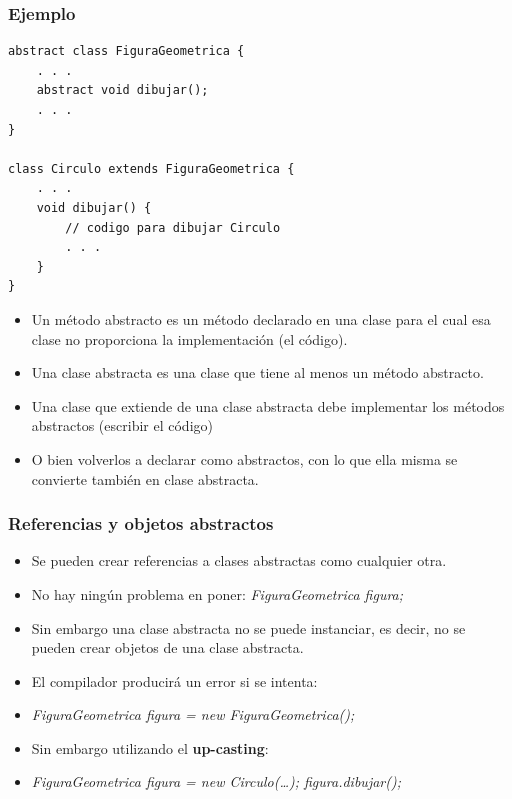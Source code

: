 \documentclass{beamer}
\begin{document}
\begin{frame}[fragile]
\frametitle{Ejemplo}
\begin{scriptsize}
\begin{verbatim}
abstract class FiguraGeometrica {
    . . .
    abstract void dibujar();
    . . .
}

class Circulo extends FiguraGeometrica {
    . . .
    void dibujar() {
        // codigo para dibujar Circulo
        . . .
    }
} 
\end{verbatim}
\pause
\begin{itemize}[<+->]
\item  Un método abstracto es un método declarado en una clase para el cual esa clase no proporciona la implementación (el código).
\item Una clase abstracta es una clase que tiene al menos un método abstracto.
\item Una clase que extiende de una clase abstracta debe implementar los métodos abstractos (escribir el código)
\item O bien volverlos a declarar como abstractos, con lo que ella misma se convierte también en clase abstracta. 
\end{itemize}
\end{scriptsize}
\end{frame}

 
\begin{frame}[fragile]
\frametitle{Referencias y objetos abstractos}
\begin{itemize}[<+->]
\item Se pueden crear referencias a clases abstractas como cualquier otra.
\item No hay ningún problema en poner: \emph{FiguraGeometrica figura;}
\item Sin embargo una clase abstracta no se puede instanciar, es decir, no se pueden crear objetos de una clase abstracta. 
\item El compilador producirá un error si se intenta:
\item \emph{FiguraGeometrica figura = new FiguraGeometrica();}
\item Sin embargo utilizando el \textbf{up-casting}: 
\item \emph{FiguraGeometrica figura = new Circulo(\dots); figura.dibujar();}
\end{itemize}
\end{frame}
\end{document}
